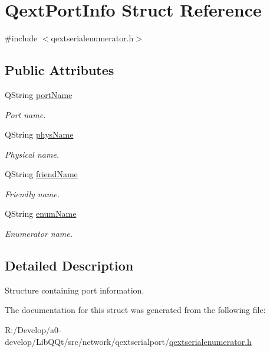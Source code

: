 \hypertarget{struct_qext_port_info}{}\section{Qext\+Port\+Info Struct Reference}
\label{struct_qext_port_info}


{\ttfamily \#include $<$qextserialenumerator.\+h$>$}

\subsection*{Public Attributes}
\begin{DoxyCompactItemize}
\item 
\mbox{\label{struct_qext_port_info_ab28ecc59f84babdf486ab5fad74e024a}} 
Q\+String \mbox{\hyperlink{struct_qext_port_info_ab28ecc59f84babdf486ab5fad74e024a}{port\+Name}}
\begin{DoxyCompactList}\small\item\em Port name. \end{DoxyCompactList}\item 
\mbox{\label{struct_qext_port_info_a9bb0593dbd5bc1a0fc081e61268eaf46}} 
Q\+String \mbox{\hyperlink{struct_qext_port_info_a9bb0593dbd5bc1a0fc081e61268eaf46}{phys\+Name}}
\begin{DoxyCompactList}\small\item\em Physical name. \end{DoxyCompactList}\item 
\mbox{\label{struct_qext_port_info_a1bf41f0d6c577f87161f4fdb077fb952}} 
Q\+String \mbox{\hyperlink{struct_qext_port_info_a1bf41f0d6c577f87161f4fdb077fb952}{friend\+Name}}
\begin{DoxyCompactList}\small\item\em Friendly name. \end{DoxyCompactList}\item 
\mbox{\label{struct_qext_port_info_a47a6287c969ce9797b87f9ffdf36763c}} 
Q\+String \mbox{\hyperlink{struct_qext_port_info_a47a6287c969ce9797b87f9ffdf36763c}{enum\+Name}}
\begin{DoxyCompactList}\small\item\em Enumerator name. \end{DoxyCompactList}\end{DoxyCompactItemize}


\subsection{Detailed Description}
Structure containing port information. 

The documentation for this struct was generated from the following file\+:\begin{DoxyCompactItemize}
\item 
R\+:/\+Develop/a0-\/develop/\+Lib\+Q\+Qt/src/network/qextserialport/\mbox{\hyperlink{qextserialenumerator_8h}{qextserialenumerator.\+h}}\end{DoxyCompactItemize}
